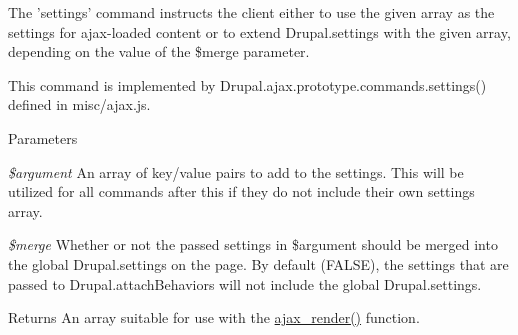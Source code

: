The 'settings' command instructs the client either to use the given array as the settings for ajax-\/loaded content or to extend Drupal.settings with the given array, depending on the value of the \$merge parameter.

This command is implemented by Drupal.ajax.prototype.commands.settings() defined in misc/ajax.js.


\begin{DoxyParams}{Parameters}
\item[{\em \$argument}]An array of key/value pairs to add to the settings. This will be utilized for all commands after this if they do not include their own settings array. \item[{\em \$merge}]Whether or not the passed settings in \$argument should be merged into the global Drupal.settings on the page. By default (FALSE), the settings that are passed to Drupal.attachBehaviors will not include the global Drupal.settings.\end{DoxyParams}
\begin{DoxyReturn}{Returns}
An array suitable for use with the \hyperlink{group__ajax_ga241c2426bdde049c55b05b7bf5d714a2}{ajax\_\-render()} function. 
\end{DoxyReturn}
